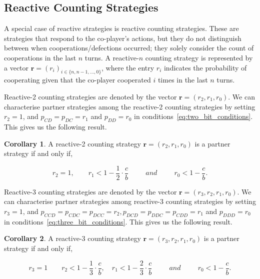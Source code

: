 \documentclass{article}
\theoremstyle{definition}
\newtheorem{corollary}{Corollary}[theorem]
\begin{document}
\subsection{Reactive Counting Strategies}

A special case of reactive strategies is reactive counting strategies. These are
strategies that respond to the co-player's actions, but they do not distinguish
between when cooperations/defections occurred; they solely consider the count of
cooperations in the last $n$ turns. A reactive-$n$ counting strategy is represented
by a vector $\mathbf{r}=(r_i)_{i \in \{n, n -1, \dots, 0\}}$, where the entry \(r_i\)
indicates the probability of cooperating given that the co-player cooperated
\(i\) times in the last \(n\) turns.

Reactive-2 counting strategies are denoted by the vector $\mathbf{r}=(r_2,
r_1, r_0)$. We can characterise partner strategies among the reactive-2
counting strategies by setting $r_2 = 1$, and $p_{CD} = p_{DC} = r_1$ and
$p_{DD} = r_0$ in conditions~\eqref{eq:two_bit_conditions}. This gives us the
following result.

\begin{corollary}
A reactive-2 counting strategy $\mathbf{r} = (r_2, r_1, r_0)$ is a partner strategy if and only if,

\begin{equation}\label{eq:counting_two_bit_conditions}
  \displaystyle r_2 = 1, \qquad r_1 < 1-\frac{1}{2} \cdot \frac{c}{b} \qquad ~~and~~ \qquad r_0 < 1\!-\! \frac{c}{b}.
\end{equation}
\end{corollary}

Reactive-3 counting strategies are denoted by the vector $\mathbf{r}=(r_3,
r_2, r_1, r_0)$. We can characterise partner strategies among reactive-3
counting strategies by setting $r_3 = 1$, and $p_{CCD} = p_{CDC} = p_{DCC} =
r_2, p_{DCD} = p_{DDC} = p_{CDD} = r_1$ and $p_{DDD} = r_0$ in
conditions~\eqref{eq:three_bit_conditions}. This gives us the following result.

\begin{corollary}
A reactive-3 counting strategy $\mathbf{r} = (r_3, r_2, r_1, r_0)$ is a partner strategy if and only if,

\begin{equation}\label{eq:counting_three_bit_conditions}
  \displaystyle r_3 = 1 \qquad r_2 < 1- \frac{1}{3} \cdot \frac{c}{b}, \quad r_1 < 1- \frac{2}{3} \cdot \frac{c}{b} \qquad ~~and~~ \qquad r_0 < 1\!-\! \frac{c}{b}.
\end{equation}
\end{corollary}
\end{document}
